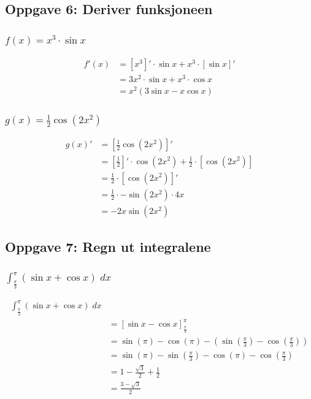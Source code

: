 \documentclass{article}
\begin{document}
\subsection{Oppgave 6: Deriver funksjoneen}

\subsubsection{$f(x)=x^3 \cdot \sin x$}

\begin{align*}
    f'(x) &= [x^3]' \cdot \sin x + x^3 \cdot [\sin x]' \\
    &= 3x^2 \cdot \sin x + x^3 \cdot \cos x \\
    &= x^2(3 \sin x - x \cos x)
\end{align*}

\subsubsection{$g(x)=\frac{1}{2} \cos(2x^2)$}

\begin{align*}
    g(x)'&=[\frac{1}{2} \cos(2x^2)]' \\
    &=[\frac{1}{2}]'\cdot\cos(2x^2) + \frac{1}{2}\cdot[\cos(2x^2)] \\
    &= \frac{1}{2} \cdot [\cos(2x^2)]' \\
    &= \frac{1}{2} \cdot -\sin(2x^2) \cdot 4x \\
    &= -2x\sin(2x^2)
\end{align*}

\subsection{Oppgave 7: Regn ut integralene}

\subsubsection{$\int_{\frac{\pi}{3}}^{\pi}(\sin x + \cos x) \; dx$}

\begin{align*}
    \int_{\frac{\pi}{3}}^{\pi}(\sin x + \cos x) \; dx \\
    &= [\sin x - \cos x]^\pi_\frac{\pi}{3} \\
    &= \sin(\pi) - \cos(\pi) - (\sin(\frac{\pi}{3}) - \cos (\frac{\pi}{3})) \\
    &= \sin(\pi)-\sin(\frac{\pi}{3})-\cos (\pi) - \cos (\frac{\pi}{3}) \\
    &= 1 - \frac{\sqrt{3}}{2} + \frac{1}{2} \\
    &= \frac{3-\sqrt{3}}{2}
\end{align*}
\end{document}
